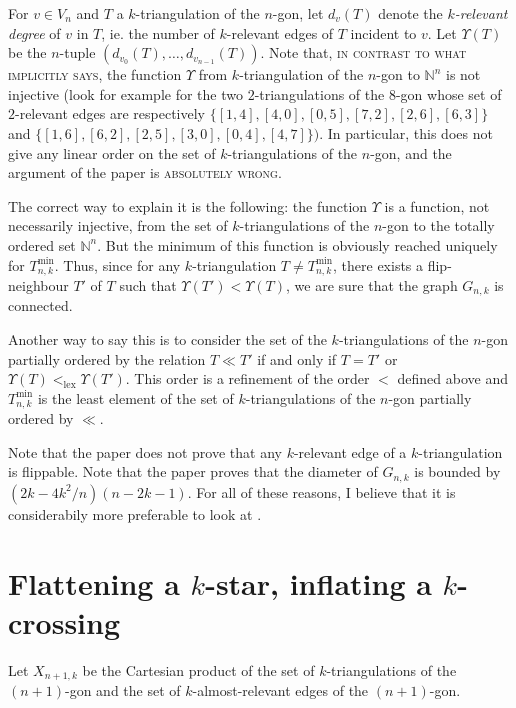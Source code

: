 \documentclass[12pt]{amsart}
\begin{document}
\begin{bibremark}
For $v\in V_n$ and $T$ a $k$-triangulation of the $n$-gon, let $d_v(T)$ denote the \emph{$k$-relevant degree} of $v$ in $T$, ie. the number of $k$-relevant edges of $T$ incident to $v$.
Let $\Upsilon(T)$ be the $n$-tuple $(d_{v_0}(T),\ldots,d_{v_{n-1}}(T))$.
Note that, \textsc{in contrast to what \cite{dkm-lahp-02} implicitly says}, the function $\Upsilon$ from $k$-triangulation of the $n$-gon to $\mathbb{N}^n$ is not injective (look for example for the two $2$-triangulations of the $8$-gon whose set of $2$-relevant edges are respectively $\{[1,4],[4,0],[0,5],[7,2],[2,6],[6,3]\}$ and $\{[1,6],[6,2],[2,5],[3,0],[0,4],[4,7]\})$. In particular, this does not give any linear order on the set of $k$-triangulations of the $n$-gon, and the argument of the paper is \textsc{absolutely wrong}.

The correct way to explain it is the following: the function $\Upsilon$ is a function, not necessarily injective, from the set of $k$-triangulations of the $n$-gon to the totally ordered set $\mathbb{N}^n$. But the minimum of this function is obviously reached uniquely for $T_{n,k}^{\min}$. Thus, since for any $k$-triangulation $T\ne T_{n,k}^{\min}$, there exists a flip-neighbour $T'$ of $T$ such that $\Upsilon(T')<\Upsilon(T)$, we are sure that the graph $G_{n,k}$ is connected.

Another way to say this is to consider the set of the $k$-triangulations of the $n$-gon partially ordered by the relation $T\ll T'$ if and only if $T=T'$ or $\Upsilon(T)<_{\mathrm{lex}}\Upsilon(T')$. This order is a refinement of the order $<$ defined above and $T_{n,k}^{\min}$ is the least element of the set of $k$-triangulations of the $n$-gon partially ordered by $\ll$.

Note that the paper \cite{dkm-lahp-02} does not prove that any $k$-relevant edge of a $k$-triangulation is flippable. Note that the paper \cite{n-gdfcp-00} proves that the diameter of $G_{n,k}$ is bounded by $(2k-4k^2/n)(n-2k-1)$. For all of these reasons, I believe that it is considerabily more preferable to look at \cite{n-gdfcp-00}.

\end{bibremark}


\section{Flattening a $k$-star, inflating a $k$-crossing}

Let $X_{n+1,k}$ be the Cartesian product of the set of $k$-triangulations of the $(n+1)$-gon and the set of $k$-almost-relevant edges of the $(n+1)$-gon.
\end{document}
